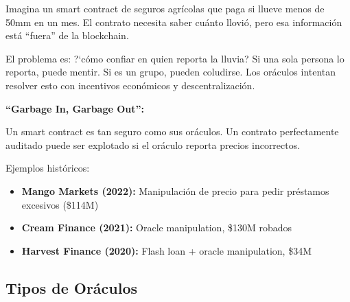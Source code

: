 \documentclass[11pt,a4paper,twoside]{book}
\begin{document}
\begin{intuicion}
Imagina un smart contract de seguros agr\'icolas que paga si llueve menos de 50mm en un mes. El contrato necesita saber cu\'anto llovi\'o, pero esa informaci\'on est\'a ``fuera'' de la blockchain.

El problema es: ?`c\'omo confiar en quien reporta la lluvia? Si una sola persona lo reporta, puede mentir. Si es un grupo, pueden coludirse. Los or\'aculos intentan resolver esto con incentivos econ\'omicos y descentralizaci\'on.
\end{intuicion}

\begin{remark}
\textbf{``Garbage In, Garbage Out'':}

Un smart contract es tan seguro como sus or\'aculos. Un contrato perfectamente auditado puede ser explotado si el or\'aculo reporta precios incorrectos.

Ejemplos hist\'oricos:
\begin{itemize}
    \item \textbf{Mango Markets (2022):} Manipulaci\'on de precio para pedir pr\'estamos excesivos (\$114M)
    \item \textbf{Cream Finance (2021):} Oracle manipulation, \$130M robados
    \item \textbf{Harvest Finance (2020):} Flash loan + oracle manipulation, \$34M
\end{itemize}
\end{remark}

\subsection{Tipos de Or\'aculos}
\end{document}
